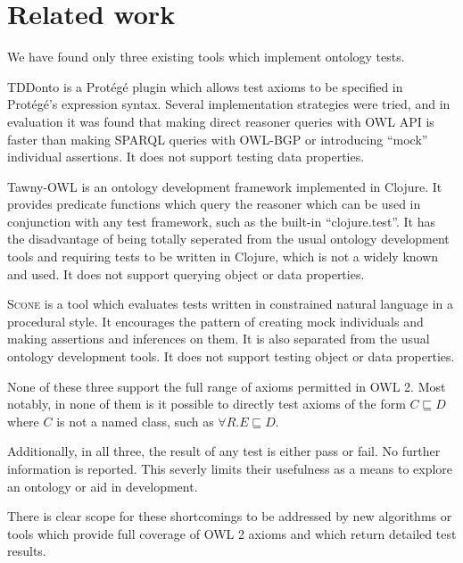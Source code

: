 \documentclass[paper.tex]{subfiles}
\begin{document}
\section{Related work}
\label{sec:related}

We have found only three existing tools which implement ontology tests.

TDDonto \cite{Lawrynowicz:TDDontoTool} is a Prot\'eg\'e plugin which allows test axioms to be specified in Prot\'eg\'e's expression syntax.
Several implementation strategies were tried, and in evaluation it was found that making direct reasoner queries with OWL API is faster than making SPARQL queries with OWL-BGP or introducing ``mock'' individual assertions.
It does not support testing data properties.

Tawny-OWL \cite{Warrender:HowWhatWhyTest} is an ontology development framework implemented in Clojure.
It provides predicate functions which query the reasoner which can be used in conjunction with any test framework, such as the built-in ``clojure.test''.
It has the disadvantage of being totally seperated from the usual ontology development tools and requiring tests to be written in Clojure, which is not a widely known and used.
It does not support querying object or data properties.

\textsc{Scone} \cite{Scone:Bitbucket} is a tool which evaluates tests written in constrained natural language in a procedural style.
It encourages the pattern of creating mock individuals and making assertions and inferences on them.
It is also separated from the usual ontology development tools.  It does not support testing object or data properties.

None of these three support the full range of axioms permitted in OWL 2.
Most notably, in none of them is it possible to directly test axioms of the form $C \sqsubseteq D$ where $C$ is not a named class, such as $\forall R.E \sqsubseteq D$.

Additionally, in all three, the result of any test is either pass or fail.
No further information is reported.
This severly limits their usefulness as a means to explore an ontology or aid in development.

There is clear scope for these shortcomings to be addressed by new algorithms or tools which provide full coverage of OWL 2 axioms and which return detailed test results.
\end{document}
